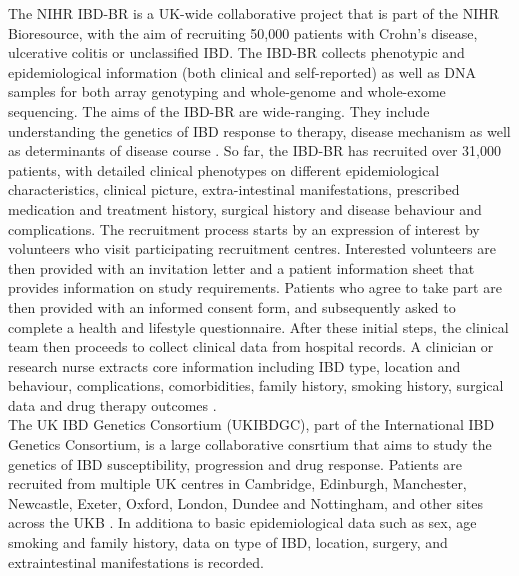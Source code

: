The NIHR IBD-BR is a UK-wide collaborative project that is part of the NIHR Bioresource, with the aim of recruiting 50,000 patients with Crohn's disease, ulcerative colitis or unclassified IBD. The IBD-BR collects phenotypic and epidemiological information (both clinical and self-reported) as well as DNA samples for both array genotyping and whole-genome and whole-exome sequencing. The aims of the IBD-BR are wide-ranging. They include understanding the genetics of IBD response to therapy, disease mechanism as well as determinants of disease course \cite{ibdbr-protocol-v8,ibdbr-questionnaire-v7,ibdbr-further-info}. So far, the IBD-BR has recruited over 31,000 patients, with detailed clinical phenotypes on different epidemiological characteristics, clinical picture, extra-intestinal manifestations, prescribed medication and treatment history, surgical history and disease behaviour and complications. The recruitment process starts by an expression of interest by volunteers who visit participating recruitment centres. Interested volunteers are then provided with an invitation letter and a patient information sheet that provides information on study requirements. Patients who agree to take part are then provided with an informed consent form, and subsequently asked to complete a health and lifestyle questionnaire. After these initial steps, the clinical team then proceeds to collect clinical data from hospital records. A clinician or research nurse extracts core information including IBD type, location and behaviour, complications, comorbidities, family history, smoking history, surgical data and
drug therapy outcomes \cite{ibdbr-protocol-v8}. \\

The UK IBD Genetics Consortium (UKIBDGC), part of the International IBD Genetics Consortium, is a large collaborative consrtium that aims to study the genetics of IBD susceptibility, progression and drug response. Patients are recruited from multiple UK centres in Cambridge, Edinburgh, Manchester, Newcastle, Exeter, Oxford, London, Dundee and Nottingham, and other sites across the UKB \cite{ukibdgc-info}. In additiona to basic epidemiological data such as sex, age smoking and family history, data on type of IBD, location, surgery, and extraintestinal manifestations is recorded. \\

